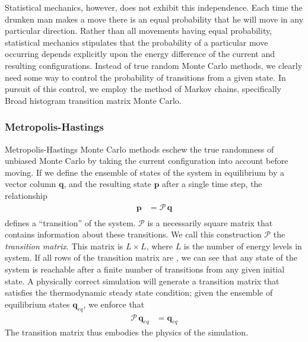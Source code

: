 \documentclass[12pt]{article}
\begin{document}
Statistical mechanics, however, does not exhibit this independence. Each time the drunken man makes a move there is an equal probability that he will move in any particular direction. Rather than all movements having equal probability, statistical mechanics stipulates that the probability of a particular move occurring depends explicitly upon the energy difference of the current and resulting configurations. Instead of true random Monte Carlo methods, we clearly need some way to control the probability of transitions from a given state. In pursuit of this control, we employ the method of Markov chains, specifically Broad histogram transition matrix Monte Carlo.
\subsubsection{Metropolis-Hastings}
Metropolis-Hastings Monte Carlo methods eschew the true randomness of unbiased Monte Carlo by taking the current configuration into account before moving. If we define the ensemble of states of the system in equilibrium by a vector column $\mathbf{q}$, and the resulting state $\mathbf{p}$ after a single time step, the relationship
\begin{align*}
    \mathbf{p} &= \mathcal{P}\, \mathbf{q}\\
\end{align*}
defines a ``transition'' of the system. $\mathcal{P}$ is a necessarily square matrix that contains information about these transitions. We call this construction $\mathcal{P}$ the {\it transition matrix}. This matrix is $L\times L$, where $L$ is the number of energy levels in system. If all rows of the transition matrix are , we can see that any state of the system is reachable after a finite number of transitions from any given initial state. A physically correct simulation will generate a transition matrix that satisfies the thermodynamic steady state condition; given the ensemble of equilibrium states $\mathbf{q}_{eq}$, we enforce that
\begin{align}
    \mathcal{P}\,\mathbf{q}_{eq} &= \mathbf{q}_{eq}
    \label{thermo-steady-state}
\end{align}
The transition matrix thus embodies the physics of the simulation.
\end{document}
